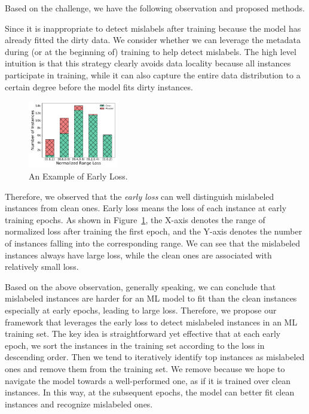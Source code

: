 Based on the challenge, we have the following observation and proposed methods.




 Since it is inappropriate to detect mislabels after training because the model has already fitted the dirty data. We consider whether we can leverage the metadata during (or at the beginning of) training to help detect mislabels. The high level intuition is that this strategy clearly avoids data locality because all instances participate in training, while it can also capture the entire data distribution to a certain degree before the model fits dirty instances. 


\begin{figure}
	\centering
	\hspace{-2em}
	\includegraphics[width=0.35\textwidth]{figures/loss}
	\caption{An Example of Early Loss.}
	\label{fig:loss}
\end{figure}

Therefore,  we observed that the \textit{early loss} can well distinguish mislabeled instances from clean ones. Early loss means the loss of each instance at early training epochs. As shown in Figure~\ref{fig:loss}, the X-axis denotes the range of normalized loss after training the first epoch,  and the Y-axis denotes the number of instances falling into the corresponding range. We can see that  the mislabeled instances always have large loss, while the clean ones are associated with relatively small loss. 

 Based on the above observation, generally speaking, we can conclude that mislabeled instances are harder for an ML model to fit than the clean instances especially at early epochs, leading to large loss. Therefore, we propose our \sys framework that leverages the early loss to detect mislabeled instances in an ML training set. The key idea is straightforward yet effective that at each early epoch,  we sort the instances in the training set according to the loss in descending order. Then we tend to iteratively identify top instances as mislabeled ones and remove them from the training set. We remove because we hope to  navigate the model  towards a well-performed one, as if it is trained over clean instances. In this way, at the subsequent epochs, the model can better fit clean instances and recognize mislabeled ones. 


